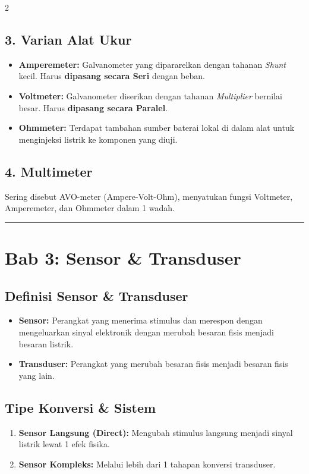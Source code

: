 \documentclass[10pt]{article}
\begin{document}
\begin{multicols}{2}
\subsection*{3. Varian Alat Ukur}
\begin{itemize}
    \item \textbf{Amperemeter:} Galvanometer yang dipararelkan dengan tahanan \textit{Shunt} kecil. Harus \textbf{dipasang secara Seri} dengan beban.
    \item \textbf{Voltmeter:} Galvanometer diserikan dengan tahanan \textit{Multiplier} bernilai besar. Harus \textbf{dipasang secara Paralel}.
    \item \textbf{Ohmmeter:} Terdapat tambahan sumber baterai lokal di dalam alat untuk menginjeksi listrik ke komponen yang diuji.
\end{itemize}

\subsection*{4. Multimeter}
Sering disebut AVO-meter (Ampere-Volt-Ohm), menyatukan fungsi Voltmeter, Amperemeter, dan Ohmmeter dalam 1 wadah.

\noindent\rule{\columnwidth}{0.4pt}

\section*{Bab 3: Sensor \& Transduser}
\label{bab3}

\subsection*{Definisi Sensor \& Transduser}
\begin{itemize}
    \item \textbf{Sensor:} Perangkat yang menerima stimulus dan merespon dengan mengeluarkan sinyal elektronik dengan merubah besaran fisis menjadi besaran listrik.
    \item \textbf{Transduser:} Perangkat yang merubah besaran fisis menjadi besaran fisis yang lain.
\end{itemize}

\subsection*{Tipe Konversi \& Sistem}
\begin{enumerate}
    \item \textbf{Sensor Langsung (Direct):} Mengubah stimulus langsung menjadi sinyal listrik lewat 1 efek fisika.
    \item \textbf{Sensor Kompleks:} Melalui lebih dari 1 tahapan konversi transduser.
\end{enumerate}


\end{multicols}
\end{document}
